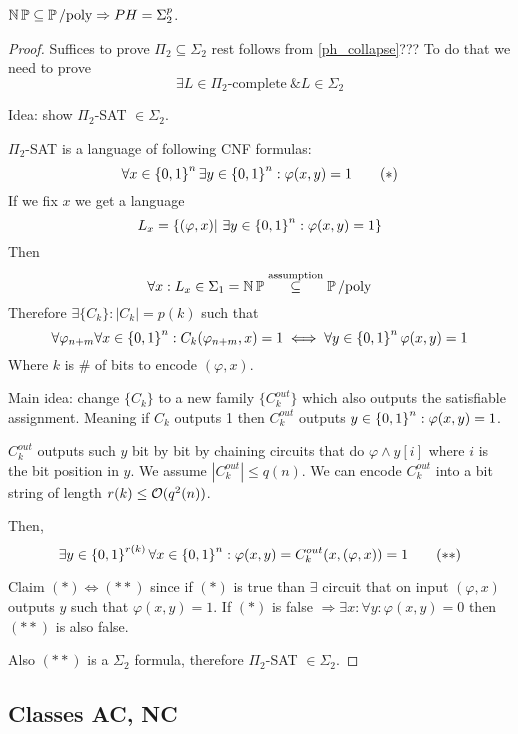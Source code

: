\begin{theorem}
	$\operatorname{\operatorname{\mathbb{N}}\mathbb{P}} \subseteq \operatorname{\operatorname{\mathbb{P}}/poly} \Rightarrow PH = \Sigma_2^p$.
\end{theorem}
\begin{proof}
	Suffices to prove $\Pi_2 \subseteq \Sigma_2$ rest follows from \cref{ph_collapse}???
	To do that we need to prove
	\[\exists L \in \Pi_2\text{-complete}\ \& L \in \Sigma_2 \]

	Idea: show $\Pi_2$-SAT $\in \Sigma_2$.

	$\Pi_2$-SAT is a language of following CNF formulas:
	\begin{equation}
		\forall x \in \operatorname{\{ 0, 1 \}}^n \exists y \in \operatorname{\{ 0, 1 \}}^n: \varphi(x, y) = 1
		\tag{$*$}
	\end{equation}
	If we fix $x$ we get a language
	\[ L_x = \{ (\varphi, x) |\ \exists y \in \szo^n: \varphi(x, y) = 1 \} \]
	Then
	\[ \forall x: L_x \in \Sigma_1 = \operatorname{\operatorname{\mathbb{N}}\mathbb{P}} \stackrel{\text{assumption}}{\subseteq} \operatorname{\operatorname{\mathbb{P}}/poly} \]
	Therefore $\exists \{ C_k \}: |C_k| = p(k)$ such that
	\[ \forall \varphi_{n + m} \forall x \in \operatorname{\{ 0, 1 \}}^n: C_k(\varphi_{n + m}, x) = 1 \iff \forall y \in \operatorname{\{ 0, 1 \}}^n \varphi(x, y) = 1 \]
	Where $k$ is \# of bits to encode $(\varphi, x)$.

	Main idea: change $\{ C_k \}$ to a new family $\{ C_k^{out} \}$ which also outputs the satisfiable assignment.
	Meaning if $C_k$ outputs 1 then $C_k^{out}$ outputs $y \in \operatorname{\{ 0, 1 \}}^n: \varphi(x, y) = 1$.

	$C_k^{out}$ outputs such $y$ bit by bit by chaining circuits that do $\varphi \land y[i]$ where $i$ is the bit position in $y$.
	We assume $|C_k^{out}| \leq q(n)$.
	We can encode $C_k^{out}$ into a bit string of length $r(k) \leq \mathcal{O}(q^2(n))$.

	Then,
	\begin{equation}
		\exists y \in \operatorname{\{ 0, 1 \}}^{r(k)} \forall x \in \operatorname{\{ 0, 1 \}}^n: \varphi(x, y) = C_k^{out}(x, (\varphi, x)) = 1
	\tag{$**$}
	\end{equation}

	Claim $(*) \iff (**)$ since if $(*)$ is true than $\exists$ circuit that on input $(\varphi, x)$ outputs $y$ such that $\varphi(x, y) = 1$.
	If $(*)$ is false $\Rightarrow \exists x: \forall y: \varphi(x, y) = 0$ then $(**)$ is also false.

	Also $(**)$ is a $\Sigma_2$ formula, therefore $\Pi_2$-SAT $\in \Sigma_2$.

\end{proof}

\subsection{Classes AC, NC}

